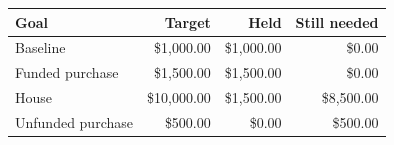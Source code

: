 \par\noindent\begin{tabularx}{\textwidth}{@{}Yrrr@{}}
\toprule
Goal & Target & Held & Still needed\\\midrule
Baseline & \$1,000.00 & \$1,000.00 & \$0.00\\
Funded purchase & \$1,500.00 & \$1,500.00 & \$0.00\\
House & \$10,000.00 & \$1,500.00 & \$8,500.00\\
Unfunded purchase & \$500.00 & \$0.00 & \$500.00\\
\bottomrule
\end{tabularx}\par
